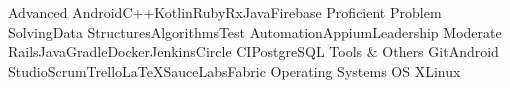 \begin{cvskills}
  \cvskill
    {Advanced}
    {Android{\dotsep}C++{\dotsep}Kotlin{\dotsep}Ruby{\dotsep}RxJava{\dotsep}Firebase}
  \cvskill
    {Proficient}
    {Problem Solving{\dotsep}Data Structures{\dotsep}Algorithms{\dotsep}Test Automation{\dotsep}Appium{\dotsep}Leadership}
  \cvskill
    {Moderate}
    {Rails{\dotsep}Java{\dotsep}Gradle{\dotsep}Docker{\dotsep}Jenkins{\dotsep}Circle CI{\dotsep}PostgreSQL}
  \cvskill
    {Tools \& Others}
    {Git{\dotsep}Android Studio{\dotsep}Scrum{\dotsep}Trello{\dotsep}\LaTeX{\dotsep}SauceLabs{\dotsep}Fabric}
  \cvskill
    {Operating Systems}
    {OS X{\dotsep}Linux}
\end{cvskills}
